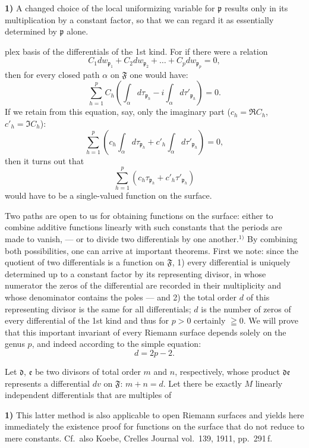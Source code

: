\documentclass{article}
\begin{document}
\textbf{1)} A changed choice of the local uniformizing variable for $\mathfrak{p}$ results only in its multiplication by a constant factor, so that we can regard it as essentially determined by $\mathfrak{p}$ alone.

plex basis of the differentials of the 1st kind. For if there were a relation
\[ C_1 dw_{\mathfrak{p}_1} + C_2 dw_{\mathfrak{p}_2} + \dots + C_p dw_{\mathfrak{p}_p} = 0, \]
then for every closed path $\alpha$ on $\mathfrak{F}$ one would have:
\[ \sum_{h=1}^p C_h \left( \int_\alpha d\tau_{\mathfrak{p}_h} - i \int_\alpha d\tau'_{\mathfrak{p}_h} \right) = 0. \]
If we retain from this equation, say, only the imaginary part ($c_h = \Re C_h$, $c'_h = \Im C_h$):
\[ \sum_{h=1}^p \left( c_h \int_\alpha d\tau_{\mathfrak{p}_h} + c'_h \int_\alpha d\tau'_{\mathfrak{p}_h} \right) = 0, \]
then it turns out that
\[ \sum_{h=1}^p (c_h \tau_{\mathfrak{p}_h} + c'_h \tau'_{\mathfrak{p}_h}) \]
would have to be a single-valued function on the surface.

Two paths are open to us for obtaining functions on the surface: either to combine additive functions linearly with such constants that the periods are made to vanish, --- or to divide two differentials by one another.${}^{1)}$ By combining both possibilities, one can arrive at important theorems. First we note: since the quotient of two differentials is a function on $\mathfrak{F}$,
1) every differential is uniquely determined up to a constant factor by its representing divisor, in whose numerator the zeros of the differential are recorded in their multiplicity and whose denominator contains the poles --- and
2) the total order $d$ of this representing divisor is the same for all differentials; $d$ is the number of zeros of every differential of the 1st kind and thus for $p > 0$ certainly $\geqq 0$. We will prove that this important invariant of every Riemann surface depends solely on the genus $p$, and indeed according to the simple equation:
\[ d = 2p - 2. \]

Let $\mathfrak{d}$, $\mathfrak{e}$ be two divisors of total order $m$ and $n$, respectively, whose product $\mathfrak{d}\mathfrak{e}$ represents a differential $dv$ on $\mathfrak{F}$: $m + n = d$. Let there be exactly $M$ linearly independent differentials that are multiples of

\textbf{1)} This latter method is also applicable to open Riemann surfaces and yields here immediately the existence proof for functions on the surface that do not reduce to mere constants. Cf.\ also Koebe, Crelles Journal vol.~139, 1911, pp.~291\,f.
\end{document}
